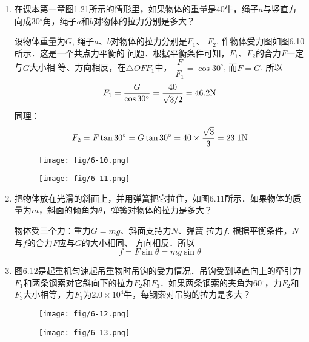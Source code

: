 \begin{enumerate}
    \item 在课本第一章图1.21所示的情形里，如果物体的重量是40牛，绳子$a$与竖直方向成30$^\circ$角，绳子$a$和$b$对物体的拉力分别是多大？

    \begin{solution}
        设物体重量为$G$, 绳子$a$、$b$对物体的拉力分别是$F_1$、
        $F_2$. 作物体受力图如图6.10所示．这是一个共点力平衡的
        问题．根据平衡条件可知，$F_1$、$F_2$的合力$F$一定与$G$大小相
        等、方向相反，在$\triangle OFF_1$中，
        $\dfrac{F}{F_1}=\cos30^{\circ}$, 而$F=G$, 所以
\[F_1=\frac{G}{\cos 30^{\circ}}=\frac{40}{\sqrt{3}/2}=46.2{\rm N}\]
同理：
\[F_2=F\tan 30^{\circ}=G\tan 30^{\circ}=40\times \frac{\sqrt{3}}{3}=23.1{\rm N}\]    
    \end{solution}

    \begin{figure}[htp]\centering
        \begin{minipage}[t]{0.48\textwidth}
        \centering
    \texttt{[image: fig/6-10.png]}
        \caption{}
        \end{minipage}
        \begin{minipage}[t]{0.48\textwidth}
        \centering
    \texttt{[image: fig/6-11.png]}
        \caption{}
        \end{minipage}
        \end{figure}

    \item 把物体放在光滑的斜面上，并用弹簧把它拉住，如图6.11所示．如果物体的质量为$m$，斜面的倾角为$\theta$，弹簧对物体的拉力是多大？


    \begin{solution}
        物体受三个力：重力$G=mg$、斜面支持力$N$、弹簧
        拉力$f$. 根据平衡条件，$N$与$f$的合力$F$应与$G$的大小相同、
        方向相反．所以
     \[   f=F\sin\theta= mg\sin \theta\]
    \end{solution}


    \item 图6.12是起重机匀速起吊重物时吊钩的受力情况．吊钩受到竖直向上的牵引力$F_1$和两条钢索对它斜向下的拉カ$F_2$和$F_3$．如果两条钢索的夹角为60$^\circ$，力$F_2$和$F_3$大小相等，力$F_1$为$2.0\times 10^4$牛，每钢索对吊钩的拉力是多大？

\begin{figure}[htp]\centering
\begin{minipage}[t]{0.48\textwidth}
\centering\texttt{[image: fig/6-12.png]}
\caption{}
\end{minipage}
\begin{minipage}[t]{0.48\textwidth}
\centering\texttt{[image: fig/6-13.png]}
\caption{}
\end{minipage}
\end{figure}


\end{enumerate}
